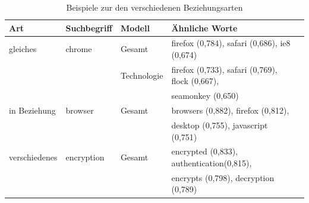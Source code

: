 \documentclass[12pt,a4paper]{report}
\begin{document}
\begin{table}[H]
\caption{Beispiele zur den verschiedenen Beziehungsarten}
\label{tab:bspBeziehungsarten}
\begin{center}
\begin{tabular}{|l||l|l|l|l|}
\hline
\textbf{Art} & \textbf{Suchbegriff} & \textbf{Modell} & \textbf{Ähnliche Worte}   \\
\hline
 gleiches &chrome	   & Gesamt & firefox (0,784), safari (0,686), ie8 (0,674) \\
   &	   & Technologie & firefox (0,733), safari (0,769), flock (0,667),\\
   &&& seamonkey (0,650) \\
\hline
 in Beziehung& browser	 & Gesamt & browsers (0,882), firefox (0,812),\\
 &&& desktop (0,755), javascript (0,751)\\
 \hline
verschiedenes& encryption	& Gesamt&  encrypted (0,833),  authentication(0,815),\\
&&&  encrypts (0,798),  decryption (0,789)\\
 	\hline
 
\end{tabular}
\end{center}
\end{table}

		
		
		
		
		
\end{document}
